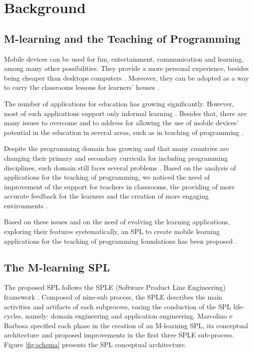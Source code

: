 
\section{Background}
\label{sec:background}



\subsection{M-learning and the Teaching of Programming}

Mobile devices can be used for fun, entertainment, communication and learning, among many other possibilities. They provide a more personal experience, besides being cheaper than desktops computers \cite{ juniortowards}. Moreover, they can be adopted as a way to carry the classrooms lessons for learners' houses \cite{20123315330601}. 

The number of applications for education has growing significantly. However, most of such applications support only informal learning \cite{marcolino_edu2015}. Besides that, there are many issues to overcome and to address for allowing the use of mobile devices' potential in the education in several areas, such as in teaching of programming \cite{marcolino_edu2015, tedesco2012}.

Despite the programming domain has growing and that many countries are changing their primary and secondary curricula for including programming disciplines, such domain still faces several problems \cite{Duncan:2014:YLC:2670757.2670774}. Based on the analysis of applications for the teaching of programming, we noticed the need of improvement of the support for teachers in classrooms, the providing of more accurate feedback for the learners and the creation of more engaging environments \cite{marcolino_edu2015, tedesco2012, Duncan:2014:YLC:2670757.2670774}. 

Based on these issues and on the need of evolving the learning applications, exploring their features systematically, an SPL to create mobile learning applications for the teaching of programming foundations has been proposed \cite{marcolinoarcht2017}. 

\subsection{The M-learning SPL}

The proposed SPL follows the SPLE (Software Product Line Engineering) framework \cite{pohl2005}. Composed of nine-sub process, the SPLE describes the main activities and artifacts of each subprocess, easing the conduction of the SPL life-cycles, namely: domain engineering and application engineering. Marcolino e Barbosa \cite{marcolinoarcht2017} specified each phase in the creation of an M-learning SPL, its conceptual architecture and proposed improvements in the first three SPLE sub-process. Figure \ref{fig:schema} presents the SPL conceptual architecture.

